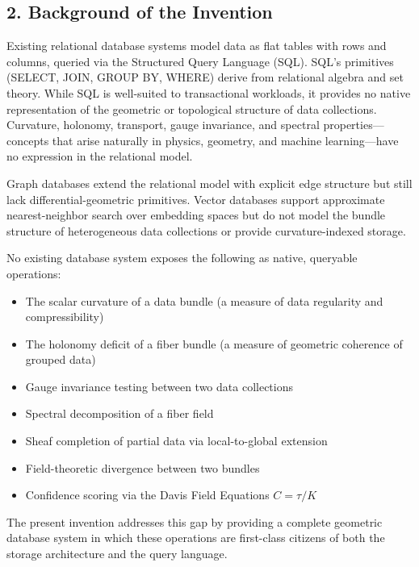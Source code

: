 \documentclass[11pt,letterpaper]{article}
\begin{document}
\subsection*{2. Background of the Invention}

Existing relational database systems model data as flat tables with rows and columns, queried via the Structured Query Language (SQL). SQL's primitives (SELECT, JOIN, GROUP BY, WHERE) derive from relational algebra and set theory. While SQL is well-suited to transactional workloads, it provides no native representation of the geometric or topological structure of data collections. Curvature, holonomy, transport, gauge invariance, and spectral properties---concepts that arise naturally in physics, geometry, and machine learning---have no expression in the relational model.

Graph databases extend the relational model with explicit edge structure but still lack differential-geometric primitives. Vector databases support approximate nearest-neighbor search over embedding spaces but do not model the bundle structure of heterogeneous data collections or provide curvature-indexed storage.

No existing database system exposes the following as native, queryable operations:
\begin{itemize}[nosep]
  \item The scalar curvature of a data bundle (a measure of data regularity and compressibility)
  \item The holonomy deficit of a fiber bundle (a measure of geometric coherence of grouped data)
  \item Gauge invariance testing between two data collections
  \item Spectral decomposition of a fiber field
  \item Sheaf completion of partial data via local-to-global extension
  \item Field-theoretic divergence between two bundles
  \item Confidence scoring via the Davis Field Equations $C = \tau/K$
\end{itemize}

The present invention addresses this gap by providing a complete geometric database system in which these operations are first-class citizens of both the storage architecture and the query language.
\end{document}

